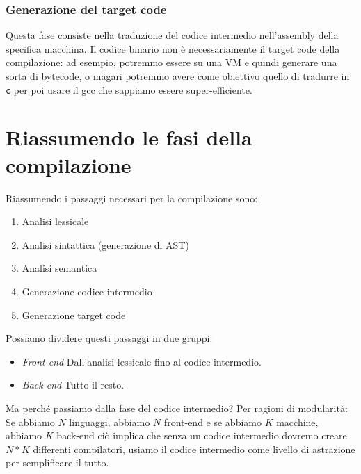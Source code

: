 \documentclass[class=book, crop=false, oneside, 12pt]{standalone}
\begin{document}
\subsubsection{Generazione del target code}
Questa fase consiste nella traduzione del codice intermedio nell’assembly della specifica macchina. Il codice binario non è necessariamente il target code della compilazione: ad esempio, potremmo essere su una VM e quindi generare una sorta di bytecode, o magari potremmo avere come obiettivo quello di tradurre in \texttt{c} per poi usare il gcc che sappiamo essere super-efficiente.

\section{Riassumendo le fasi della compilazione}
Riassumendo i passaggi necessari per la compilazione sono:
\begin{enumerate}
    \item Analisi lessicale
    \item Analisi sintattica (generazione di AST)
    \item Analisi semantica
    \item Generazione codice intermedio
    \item Generazione target code
\end{enumerate}
Possiamo dividere questi passaggi in due gruppi:
\begin{itemize}[]
    \item \emph{Front-end} Dall’analisi lessicale fino al codice intermedio.
    \item \emph{Back-end} Tutto il resto.
\end{itemize}
Ma perché passiamo dalla fase del codice intermedio? Per ragioni di modularità:
Se abbiamo \(N\) linguaggi, abbiamo \(N\) front-end e se abbiamo \(K\) macchine, abbiamo \(K\) back-end ciò implica che senza un codice intermedio dovremo creare \(N*K\) differenti compilatori, usiamo il codice intermedio come livello di astrazione per semplificare il tutto. 
\end{document}
